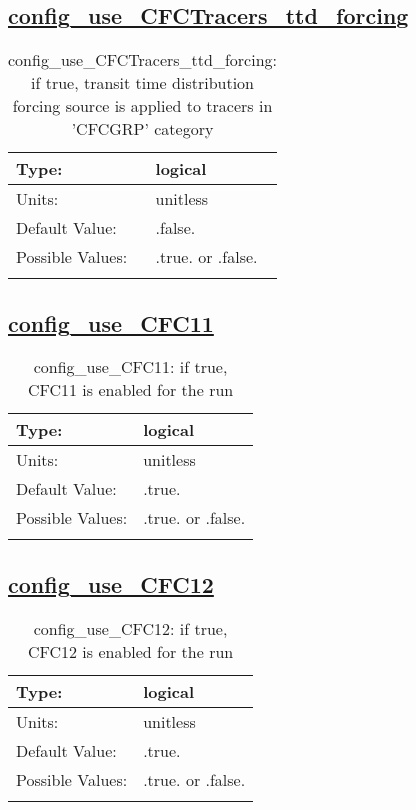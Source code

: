 \subsection[config\_use\_CFCTracers\_ttd\_forcing]{\hyperref[sec:nm_tab_tracer_forcing_CFCTracers]{config\_use\_CFCTracers\_ttd\_forcing}}
\label{subsec:nm_sec_config_use_CFCTracers_ttd_forcing}
\begin{center}
\begin{longtable}{| p{2.0in} || p{4.0in} |}
    \hline
    Type: & logical \\
    \hline
    Units: & \si{unitless} \\
    \hline
    Default Value: & .false. \\
    \hline
    Possible Values: & .true. or .false. \\
    \hline
    \caption{config\_use\_CFCTracers\_ttd\_forcing: if true, transit time distribution forcing source is applied to tracers in 'CFCGRP' category}
\end{longtable}
\end{center}
\subsection[config\_use\_CFC11]{\hyperref[sec:nm_tab_tracer_forcing_CFCTracers]{config\_use\_CFC11}}
\label{subsec:nm_sec_config_use_CFC11}
\begin{center}
\begin{longtable}{| p{2.0in} || p{4.0in} |}
    \hline
    Type: & logical \\
    \hline
    Units: & \si{unitless} \\
    \hline
    Default Value: & .true. \\
    \hline
    Possible Values: & .true. or .false. \\
    \hline
    \caption{config\_use\_CFC11: if true, CFC11 is enabled for the run}
\end{longtable}
\end{center}
\subsection[config\_use\_CFC12]{\hyperref[sec:nm_tab_tracer_forcing_CFCTracers]{config\_use\_CFC12}}
\label{subsec:nm_sec_config_use_CFC12}
\begin{center}
\begin{longtable}{| p{2.0in} || p{4.0in} |}
    \hline
    Type: & logical \\
    \hline
    Units: & \si{unitless} \\
    \hline
    Default Value: & .true. \\
    \hline
    Possible Values: & .true. or .false. \\
    \hline
    \caption{config\_use\_CFC12: if true, CFC12 is enabled for the run}
\end{longtable}
\end{center}
